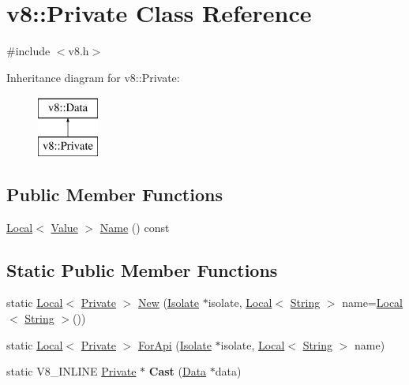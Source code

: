 \hypertarget{classv8_1_1Private}{}\section{v8\+:\+:Private Class Reference}
\label{classv8_1_1Private}


{\ttfamily \#include $<$v8.\+h$>$}

Inheritance diagram for v8\+:\+:Private\+:\begin{figure}[H]
\begin{center}
\leavevmode
\includegraphics[height=2.000000cm]{classv8_1_1Private}
\end{center}
\end{figure}
\subsection*{Public Member Functions}
\begin{DoxyCompactItemize}
\item 
\mbox{\hyperlink{classv8_1_1Local}{Local}}$<$ \mbox{\hyperlink{classv8_1_1Value}{Value}} $>$ \mbox{\hyperlink{classv8_1_1Private_ab3bbd6a2dcf6aea73f65c95f0d216f12}{Name}} () const
\end{DoxyCompactItemize}
\subsection*{Static Public Member Functions}
\begin{DoxyCompactItemize}
\item 
static \mbox{\hyperlink{classv8_1_1Local}{Local}}$<$ \mbox{\hyperlink{classv8_1_1Private}{Private}} $>$ \mbox{\hyperlink{classv8_1_1Private_ae43aa9516121ed7a24cf5bba1654b653}{New}} (\mbox{\hyperlink{classv8_1_1Isolate}{Isolate}} $\ast$isolate, \mbox{\hyperlink{classv8_1_1Local}{Local}}$<$ \mbox{\hyperlink{classv8_1_1String}{String}} $>$ name=\mbox{\hyperlink{classv8_1_1Local}{Local}}$<$ \mbox{\hyperlink{classv8_1_1String}{String}} $>$())
\item 
static \mbox{\hyperlink{classv8_1_1Local}{Local}}$<$ \mbox{\hyperlink{classv8_1_1Private}{Private}} $>$ \mbox{\hyperlink{classv8_1_1Private_a0ab8628387166b8a8abc6e9b6f40ad55}{For\+Api}} (\mbox{\hyperlink{classv8_1_1Isolate}{Isolate}} $\ast$isolate, \mbox{\hyperlink{classv8_1_1Local}{Local}}$<$ \mbox{\hyperlink{classv8_1_1String}{String}} $>$ name)
\item 
\mbox{\label{classv8_1_1Private_a3df565232e66989a2c8a9e708a1e2d86}} 
static V8\+\_\+\+I\+N\+L\+I\+NE \mbox{\hyperlink{classv8_1_1Private}{Private}} $\ast$ {\bfseries Cast} (\mbox{\hyperlink{classv8_1_1Data}{Data}} $\ast$data)
\end{DoxyCompactItemize}


